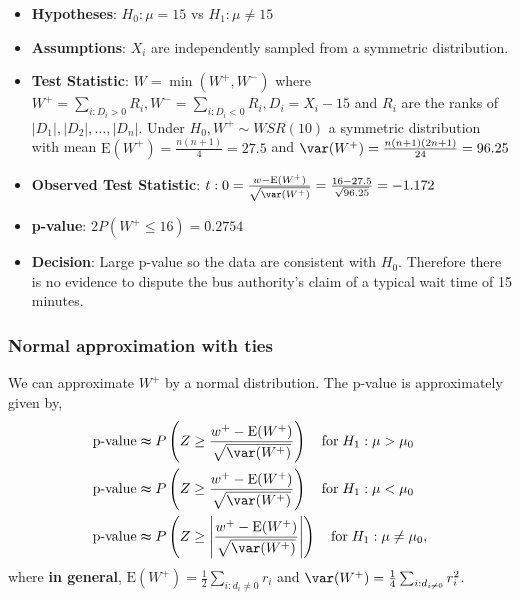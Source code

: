 \documentclass[a4paper]{article}
\begin{document}
\begin{itemize}
	\item \textbf{Hypotheses}: \( H_0: \mu = 15 \) vs \( H_1: \mu \neq 15 \)
	\item \textbf{Assumptions}: \( X_i \) are independently sampled from a symmetric distribution.
	\item \textbf{Test Statistic}: \( W = \min(W^+,W^-) \) where \( W^+ = \sum_{i:D_i>0} R_i, W^- = \sum_{i:D_i<0} R_i, D_i = X_i - 15  \)  and \( R_i \) are the ranks of \( \lvert D_1 \rvert, \lvert D_2 \rvert, \dotsc, \lvert D_n \rvert \). Under \( H_0, W^+ \sim WSR(10) \) a symmetric distribution with mean \( \mathrm{\mathrm{E}} (W^+) = \frac{n(n+1)}{4} = 27.5 \) and \( \var(W^+) = \frac{n(n+1)(2n+1)}{24} = 96.25\)  
	\item \textbf{Observed Test Statistic}: \( t:0 = \frac{w - \mathrm{E}(W^+)}{\sqrt{\var(W^+)}}  = \frac{16-27.5}{\sqrt{96.25}} = -1.172 \)
	\item \textbf{p-value}: \( 2P(W^+ \leq 16) = 0.2754 \)
	\item \textbf{Decision}: Large p-value so the data are consistent with \( H_0 \). Therefore there is no evidence to dispute the bus authority's claim of a typical wait time of 15 minutes.
\end{itemize}
\subsubsection{Normal approximation with ties}
We can approximate \( W^+ \) by a normal distribution. The p-value is approximately given by,
\begin{align*}
	\text{p-value} &\thickapprox P \left( Z \geq \frac{w^+ - \mathrm{E}(W^+)}{\sqrt{\var(W^+)}} \right) \quad\text{for}\; H_1: \mu > \mu_0\\
	\text{p-value} &\thickapprox P \left( Z \geq \frac{w^+ - \mathrm{E}(W^+)}{\sqrt{\var(W^+)}} \right) \quad\text{for}\; H_1: \mu < \mu_0\\
	\text{p-value} &\thickapprox P \left( Z \geq \left\vert\frac{w^+ - \mathrm{E}(W^+)}{\sqrt{\var(W^+)}}\right\vert \right) \quad\text{for}\; H_1: \mu \neq \mu_0,
\end{align*}
where \textcolor{myred}{\textbf{in general}}, \( \mathrm{E}(W^+) = \frac{1}{2}\sum_{i:d_i \neq 0}r_i \) and \( \var(W^+) = \frac{1}{4}\sum_{i:d_{i \neq 0}} r^{2}_{i} \).
\end{document}
